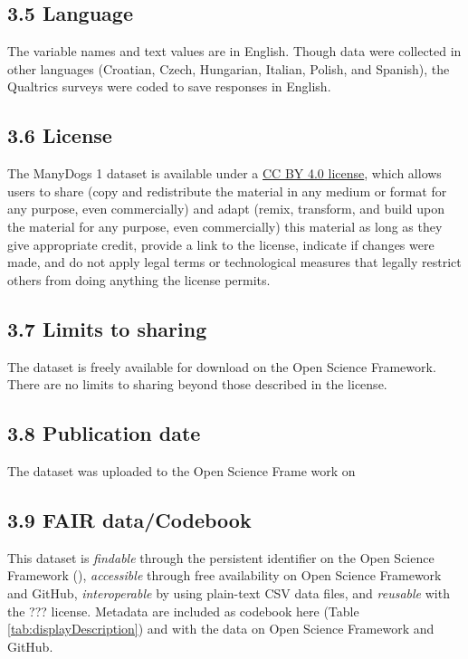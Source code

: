 \documentclass[
  man,floatsintext]{apa6}
\begin{document}
\hypertarget{language}{%
\subsection{3.5 Language}\label{language}}

The variable names and text values are in English. Though data were collected in other languages (Croatian, Czech, Hungarian, Italian, Polish, and Spanish), the Qualtrics surveys were coded to save responses in English.

\hypertarget{license}{%
\subsection{3.6 License}\label{license}}

The ManyDogs 1 dataset is available under a \href{https://creativecommons.org/licenses/by/4.0/}{CC BY 4.0 license}, which allows users to share (copy and redistribute the material in any medium or format for any purpose, even commercially) and adapt (remix, transform, and build upon the material for any purpose, even commercially) this material as long as they give appropriate credit, provide a link to the license, indicate if changes were made, and do not apply legal terms or technological measures that legally restrict others from doing anything the license permits.

\hypertarget{limits-to-sharing}{%
\subsection{3.7 Limits to sharing}\label{limits-to-sharing}}

The dataset is freely available for download on the Open Science Framework. There are no limits to sharing beyond those described in the license.

\hypertarget{publication-date}{%
\subsection{3.8 Publication date}\label{publication-date}}

The dataset was uploaded to the Open Science Frame work on

\hypertarget{fair-datacodebook}{%
\subsection{3.9 FAIR data/Codebook}\label{fair-datacodebook}}

This dataset is \emph{findable} through the persistent identifier on the Open Science Framework (), \emph{accessible} through free availability on Open Science Framework and GitHub, \emph{interoperable} by using plain-text CSV data files, and \emph{reusable} with the ??? license. Metadata are included as codebook here (Table \ref{tab:displayDescription}) and with the data on Open Science Framework and GitHub.
\end{document}
